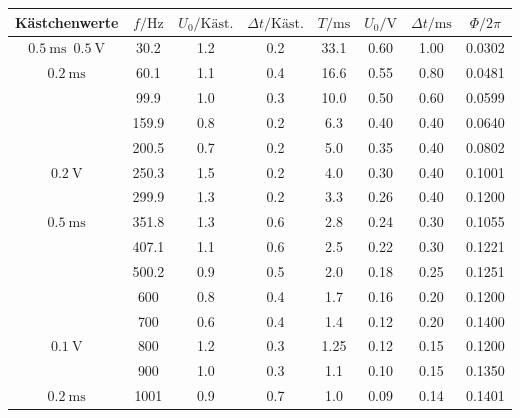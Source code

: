 \begin{table}
    \centering
    \begin{tabular}{
        c
        S[table-format=3.1]
        S
        S
        S[table-format=2.2]
        S[table-format=1.2]
        S[table-format=1.2]
        S[table-format=1.4]
    }
    \toprule
    {Kästchenwerte} & 
    {$f/ \unit{\hertz}$} &
    {$U_0 / \text{Käst.}$} &
    {$\Delta t / \text{Käst.}$} &
    {$T / \unit{\milli\s}$} &
    {$U_0 / \unit{\volt} $} & 
    {$\Delta t / \unit{\milli\s}$} &
    {$\Phi / 2 \pi$}\\
    \midrule
           
    $\qty{0.5}{\milli\s}$\, $\qty{0.5}{\volt} $ & 30.2  & 1.2 & 0.2  & 33.1 & 0.60 & 1.00 & 0.0302 \\
    $\qty{0.2}{\milli\s}$                       & 60.1  & 1.1 & 0.4  & 16.6 & 0.55 & 0.80 & 0.0481 \\
                                                & 99.9  & 1.0 & 0.3  & 10.0 & 0.50 & 0.60 & 0.0599 \\
                                                & 159.9 & 0.8 & 0.2  & 6.3  & 0.40 & 0.40 & 0.0640 \\
                                                & 200.5 & 0.7 & 0.2  & 5.0  & 0.35 & 0.40 & 0.0802 \\
    $\qty{0.2}{\volt}$                          & 250.3 & 1.5 & 0.2  & 4.0  & 0.30 & 0.40 & 0.1001 \\
                                                & 299.9 & 1.3 & 0.2  & 3.3  & 0.26 & 0.40 & 0.1200 \\
    $\qty{0.5}{\milli\s}$                       & 351.8 & 1.3 & 0.6  & 2.8  & 0.24 & 0.30 & 0.1055 \\
                                                & 407.1 & 1.1 & 0.6  & 2.5  & 0.22 & 0.30 & 0.1221 \\
                                                & 500.2 & 0.9 & 0.5  & 2.0  & 0.18 & 0.25 & 0.1251 \\
                                                & 600   & 0.8 & 0.4  & 1.7  & 0.16 & 0.20 & 0.1200 \\
                                                & 700   & 0.6 & 0.4  & 1.4  & 0.12 & 0.20 & 0.1400 \\
    $\qty{0.1}{\volt}$                          & 800   & 1.2 & 0.3  & 1.25 & 0.12 & 0.15 & 0.1200 \\
                                                & 900   & 1.0 & 0.3  & 1.1  & 0.10 & 0.15 & 0.1350 \\
    $\qty{0.2}{\milli\s}$                       & 1001  & 0.9 & 0.7  & 1.0  & 0.09 & 0.14 & 0.1401 \\
    \bottomrule
    \end{tabular}
\end{table}